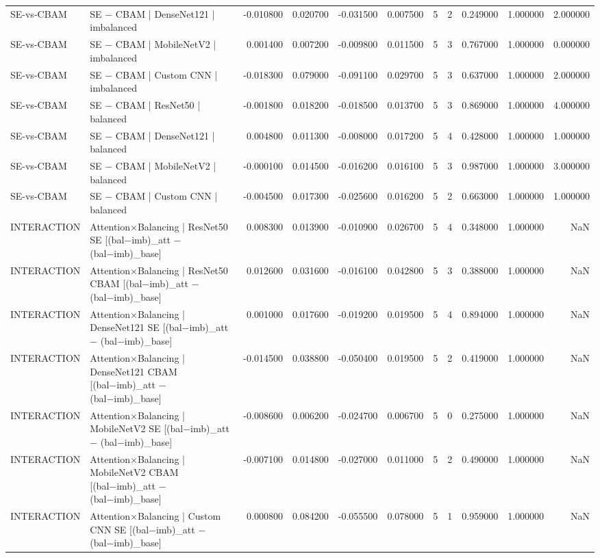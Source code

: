 \begin{tabular}{llrrrrrrrrr}
SE-vs-CBAM & SE − CBAM | DenseNet121 | imbalanced & -0.010800 & 0.020700 & -0.031500 & 0.007500 & 5 & 2 & 0.249000 & 1.000000 & 2.000000 \\
SE-vs-CBAM & SE − CBAM | MobileNetV2 | imbalanced & 0.001400 & 0.007200 & -0.009800 & 0.011500 & 5 & 3 & 0.767000 & 1.000000 & 0.000000 \\
SE-vs-CBAM & SE − CBAM | Custom CNN | imbalanced & -0.018300 & 0.079000 & -0.091100 & 0.029700 & 5 & 3 & 0.637000 & 1.000000 & 2.000000 \\
SE-vs-CBAM & SE − CBAM | ResNet50 | balanced & -0.001800 & 0.018200 & -0.018500 & 0.013700 & 5 & 3 & 0.869000 & 1.000000 & 4.000000 \\
SE-vs-CBAM & SE − CBAM | DenseNet121 | balanced & 0.004800 & 0.011300 & -0.008000 & 0.017200 & 5 & 4 & 0.428000 & 1.000000 & 1.000000 \\
SE-vs-CBAM & SE − CBAM | MobileNetV2 | balanced & -0.000100 & 0.014500 & -0.016200 & 0.016100 & 5 & 3 & 0.987000 & 1.000000 & 3.000000 \\
SE-vs-CBAM & SE − CBAM | Custom CNN | balanced & -0.004500 & 0.017300 & -0.025600 & 0.016200 & 5 & 2 & 0.663000 & 1.000000 & 1.000000 \\
INTERACTION & Attention×Balancing | ResNet50 SE  [(bal−imb)\_att − (bal−imb)\_base] & 0.008300 & 0.013900 & -0.010900 & 0.026700 & 5 & 4 & 0.348000 & 1.000000 & NaN \\
INTERACTION & Attention×Balancing | ResNet50 CBAM  [(bal−imb)\_att − (bal−imb)\_base] & 0.012600 & 0.031600 & -0.016100 & 0.042800 & 5 & 3 & 0.388000 & 1.000000 & NaN \\
INTERACTION & Attention×Balancing | DenseNet121 SE  [(bal−imb)\_att − (bal−imb)\_base] & 0.001000 & 0.017600 & -0.019200 & 0.019500 & 5 & 4 & 0.894000 & 1.000000 & NaN \\
INTERACTION & Attention×Balancing | DenseNet121 CBAM  [(bal−imb)\_att − (bal−imb)\_base] & -0.014500 & 0.038800 & -0.050400 & 0.019500 & 5 & 2 & 0.419000 & 1.000000 & NaN \\
INTERACTION & Attention×Balancing | MobileNetV2 SE  [(bal−imb)\_att − (bal−imb)\_base] & -0.008600 & 0.006200 & -0.024700 & 0.006700 & 5 & 0 & 0.275000 & 1.000000 & NaN \\
INTERACTION & Attention×Balancing | MobileNetV2 CBAM  [(bal−imb)\_att − (bal−imb)\_base] & -0.007100 & 0.014800 & -0.027000 & 0.011000 & 5 & 2 & 0.490000 & 1.000000 & NaN \\
INTERACTION & Attention×Balancing | Custom CNN SE  [(bal−imb)\_att − (bal−imb)\_base] & 0.000800 & 0.084200 & -0.055500 & 0.078000 & 5 & 1 & 0.959000 & 1.000000 & NaN \\

\end{tabular}
